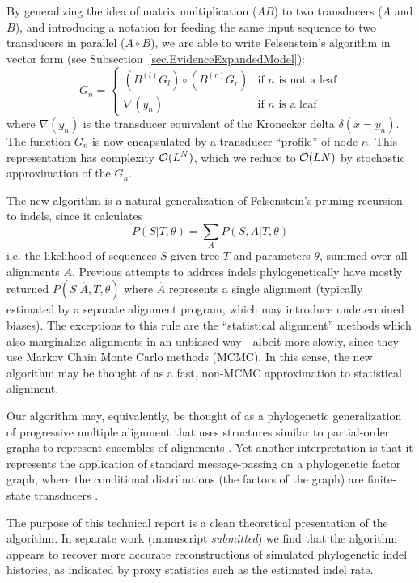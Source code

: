 \documentclass{article}
\newcommand{\secref}[1]{Subsection~\ref{sec.#1}}
\newcommand\fork{\circ}
\newcommand\recognize{\nabla}
\begin{document}
By generalizing the idea of matrix multiplication ($AB$) to two transducers ($A$ and $B$),
and introducing a notation for feeding the same input sequence to two transducers in parallel ($A \fork B$),
we are able to write Felsenstein's algorithm in vector form (see \secref{EvidenceExpandedModel}):
\[
G_n = \left\{
\begin{array}{ll}
\left( B^{(l)} G_l \right) \fork \left( B^{(r)} G_r \right) & \mbox{if $n$ is not a leaf} \\
\recognize(y_n) & \mbox{if $n$ is a leaf}
\end{array}
\right.
\]
where $\recognize(y_n)$ is the transducer equivalent of the Kronecker delta $\delta(x=y_n)$.
The function $G_n$ is now encapsulated by a transducer ``profile'' of node $n$.
This representation has complexity ${\cal O}(L^N)$, which we reduce to ${\cal O}(LN)$ by stochastic approximation of the $G_n$.

The new algorithm is a natural generalization of Felsenstein's pruning recursion to indels,
since it calculates
\[
P(S|T,\theta) = \sum_A P(S,A|T,\theta)
\]
i.e. the likelihood of sequences $S$ given tree $T$ and parameters $\theta$, summed over all alignments $A$.
Previous attempts to address indels phylogenetically have mostly returned $P(S|\hat{A},T,\theta)$ where $\hat{A}$ represents a single alignment
(typically estimated by a separate alignment program, which may introduce undetermined biases).
The exceptions to this rule are the ``statistical alignment'' methods \cite{HeinEtal2000,HolmesBruno2001,SuchardRedelings2006}
which also marginalize alignments in an unbiased way---albeit more slowly, since they use Markov Chain Monte Carlo methods (MCMC).
In this sense, the new algorithm may be thought of as a fast, non-MCMC approximation to statistical alignment.

Our algorithm may, equivalently, be thought of as a phylogenetic generalization of progressive multiple alignment \cite{HigginsSharp89}
that uses structures similar to partial-order graphs to represent ensembles of alignments \cite{LeeGrassoSharlow2002}.
Yet another interpretation is that it represents the application of standard message-passing on a phylogenetic factor graph,
where the conditional distributions (the factors of the graph) are finite-state transducers \cite{KschischangEtAl98}.

The purpose of this technical report is a clean theoretical presentation of the algorithm.
In separate work (manuscript {\em submitted}) we find that the algorithm appears to recover more accurate reconstructions of simulated phylogenetic indel histories,
as indicated by proxy statistics such as the estimated indel rate.
\end{document}
